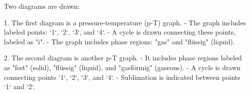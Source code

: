 Two diagrams are drawn:  

1. The first diagram is a pressure-temperature (p-T) graph.  
   - The graph includes labeled points: `1`, `2`, `3`, and `4`.  
   - A cycle is drawn connecting these points, labeled as "i".  
   - The graph includes phase regions: "gas" and "flüssig" (liquid).  

2. The second diagram is another p-T graph.  
   - It includes phase regions labeled as "fest" (solid), "flüssig" (liquid), and "gasförmig" (gaseous).  
   - A cycle is drawn connecting points `1`, `2`, `3`, and `4`.  
   - Sublimation is indicated between points `1` and `2`.